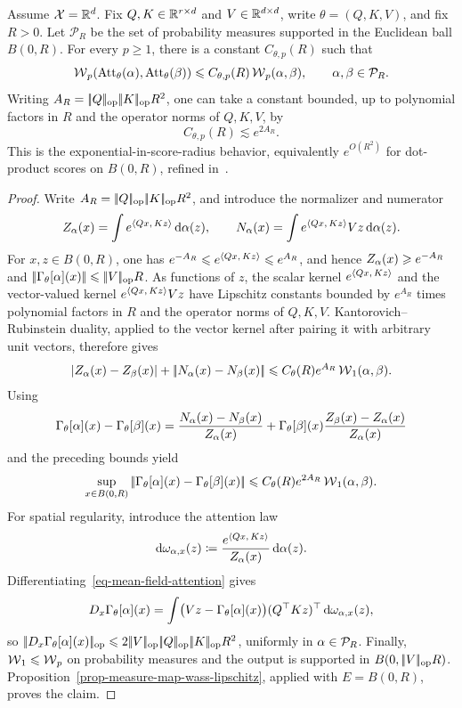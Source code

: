 \begin{prop}\label{prop-attention-wass-lipschitz}
	Assume $\mathcal{X}=\mathbb{R}^d$. Fix $Q,K\in\mathbb{R}^{r\times d}$ and $V\in\mathbb{R}^{d\times d}$, write $\theta=(Q,K,V)$, and fix $R>0$. Let $\mathcal P_R$ be the set of probability measures supported in the Euclidean ball $B(0,R)$. For every $p\geq1$, there is a constant $C_{\theta,p}(R)$ such that
	\[
		\operatorname{\mathcal{W}}_p(\operatorname{Att}_\theta(\alpha),\operatorname{Att}_\theta(\beta))
		\leqslant C_{\theta,p}(R)\operatorname{\mathcal{W}}_p(\alpha,\beta),
		\qquad \alpha,\beta\in\mathcal P_R.
	\]
	Writing $A_R=|\!| Q |\!|_{\rm op}|\!| K |\!|_{\rm op}R^2$, one can take a constant bounded, up to polynomial factors in $R$ and the operator norms of $Q,K,V$, by
	\[
		C_{\theta,p}(R)\lesssim
		e^{2A_R}.
	\]
	This is the exponential-in-score-radius behavior, equivalently $e^{O(R^2)}$ for dot-product scores on $B(0,R)$, refined in~\cite{CastinAblinPeyre2024HowSmoothAttention}.
\end{prop}
\begin{proof}
	Write \(A_R=|\!| Q |\!|_{\rm op}|\!| K |\!|_{\rm op}R^2\), and introduce the normalizer and numerator
	\[
		Z_\alpha(x)=\int e^{\langle Qx,\,Kz\rangle}\,\mathrm{d}\alpha(z),
		\qquad
		N_\alpha(x)=\int e^{\langle Qx,\,Kz\rangle}Vz\,\mathrm{d}\alpha(z).
	\]
	For \(x,z\in B(0,R)\), one has \(e^{-A_R}\leqslant e^{\langle Qx,\,Kz\rangle}\leqslant e^{A_R}\), and hence \(Z_\alpha(x)\geqslant e^{-A_R}\) and \(|\!| \Gamma_\theta[\alpha](x) |\!|\leqslant|\!| V |\!|_{\rm op}R\). As functions of \(z\), the scalar kernel \(e^{\langle Qx,\,Kz\rangle}\) and the vector-valued kernel \(e^{\langle Qx,\,Kz\rangle}Vz\) have Lipschitz constants bounded by \(e^{A_R}\) times polynomial factors in \(R\) and the operator norms of \(Q,K,V\). Kantorovich--Rubinstein duality, applied to the vector kernel after pairing it with arbitrary unit vectors, therefore gives
	\[
		|Z_\alpha(x)-Z_\beta(x)|
		+
		|\!| N_\alpha(x)-N_\beta(x) |\!|
		\leqslant C_{\theta}(R)e^{A_R}\operatorname{\mathcal{W}}_1(\alpha,\beta).
	\]
	Using
	\[
		\Gamma_\theta[\alpha](x)-\Gamma_\theta[\beta](x)
		=
		\frac{N_\alpha(x)-N_\beta(x)}{Z_\alpha(x)}
		+
		\Gamma_\theta[\beta](x)
		\frac{Z_\beta(x)-Z_\alpha(x)}{Z_\alpha(x)}
	\]
	and the preceding bounds yield
	\[
		\sup_{x\in B(0,R)}
		|\!| \Gamma_\theta[\alpha](x)-\Gamma_\theta[\beta](x) |\!|
		\leqslant C_{\theta}(R)e^{2A_R}\operatorname{\mathcal{W}}_1(\alpha,\beta).
	\]
	For spatial regularity, introduce the attention law
	\[
		\mathrm{d}\omega_{\alpha,x}(z)
		\coloneqq
		\frac{e^{\langle Qx,\,Kz\rangle}}{Z_\alpha(x)}\,\mathrm{d}\alpha(z).
	\]
	Differentiating~\eqref{eq-mean-field-attention} gives
	\[
		D_x\Gamma_\theta[\alpha](x)
		=
		\int
		\bigl(Vz-\Gamma_\theta[\alpha](x)\bigr)
		(Q^\top Kz)^\top
		\,\mathrm{d}\omega_{\alpha,x}(z),
	\]
	so \(\norm{D_x\Gamma_\theta[\al](x)}_{\rm op}\leq2\norm{V}_{\rm op}\norm{Q}_{\rm op}\norm{K}_{\rm op}R^2\), uniformly in \(\alpha\in\mathcal P_R\). Finally, \(\operatorname{\mathcal{W}}_1\leqslant\operatorname{\mathcal{W}}_p\) on probability measures and the output is supported in \(B(0,|\!| V |\!|_{\rm op}R)\). Proposition~\ref{prop-measure-map-wass-lipschitz}, applied with \(E=B(0,R)\), proves the claim.
\end{proof}

